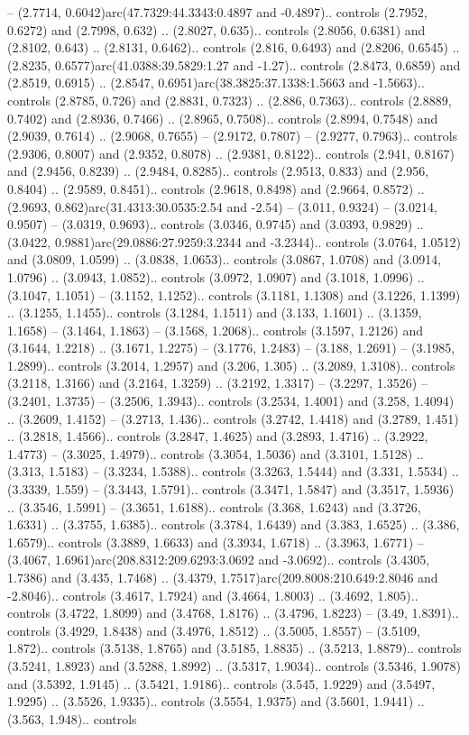-- (2.7714, 0.6042)arc(47.7329:44.3343:0.4897 and -0.4897).. controls (2.7952, 0.6272) and (2.7998, 0.632) .. (2.8027, 0.635).. controls (2.8056, 0.6381) and (2.8102, 0.643) .. (2.8131, 0.6462).. controls (2.816, 0.6493) and (2.8206, 0.6545) .. (2.8235, 0.6577)arc(41.0388:39.5829:1.27 and -1.27).. controls (2.8473, 0.6859) and (2.8519, 0.6915) .. (2.8547, 0.6951)arc(38.3825:37.1338:1.5663 and -1.5663).. controls (2.8785, 0.726) and (2.8831, 0.7323) .. (2.886, 0.7363).. controls (2.8889, 0.7402) and (2.8936, 0.7466) .. (2.8965, 0.7508).. controls (2.8994, 0.7548) and (2.9039, 0.7614) .. (2.9068, 0.7655) -- (2.9172, 0.7807) -- (2.9277, 0.7963).. controls (2.9306, 0.8007) and (2.9352, 0.8078) .. (2.9381, 0.8122).. controls (2.941, 0.8167) and (2.9456, 0.8239) .. (2.9484, 0.8285).. controls (2.9513, 0.833) and (2.956, 0.8404) .. (2.9589, 0.8451).. controls (2.9618, 0.8498) and (2.9664, 0.8572) .. (2.9693, 0.862)arc(31.4313:30.0535:2.54 and -2.54) -- (3.011, 0.9324) -- (3.0214, 0.9507) -- (3.0319, 0.9693).. controls (3.0346, 0.9745) and (3.0393, 0.9829) .. (3.0422, 0.9881)arc(29.0886:27.9259:3.2344 and -3.2344).. controls (3.0764, 1.0512) and (3.0809, 1.0599) .. (3.0838, 1.0653).. controls (3.0867, 1.0708) and (3.0914, 1.0796) .. (3.0943, 1.0852).. controls (3.0972, 1.0907) and (3.1018, 1.0996) .. (3.1047, 1.1051) -- (3.1152, 1.1252).. controls (3.1181, 1.1308) and (3.1226, 1.1399) .. (3.1255, 1.1455).. controls (3.1284, 1.1511) and (3.133, 1.1601) .. (3.1359, 1.1658) -- (3.1464, 1.1863) -- (3.1568, 1.2068).. controls (3.1597, 1.2126) and (3.1644, 1.2218) .. (3.1671, 1.2275) -- (3.1776, 1.2483) -- (3.188, 1.2691) -- (3.1985, 1.2899).. controls (3.2014, 1.2957) and (3.206, 1.305) .. (3.2089, 1.3108).. controls (3.2118, 1.3166) and (3.2164, 1.3259) .. (3.2192, 1.3317) -- (3.2297, 1.3526) -- (3.2401, 1.3735) -- (3.2506, 1.3943).. controls (3.2534, 1.4001) and (3.258, 1.4094) .. (3.2609, 1.4152) -- (3.2713, 1.436).. controls (3.2742, 1.4418) and (3.2789, 1.451) .. (3.2818, 1.4566).. controls (3.2847, 1.4625) and (3.2893, 1.4716) .. (3.2922, 1.4773) -- (3.3025, 1.4979).. controls (3.3054, 1.5036) and (3.3101, 1.5128) .. (3.313, 1.5183) -- (3.3234, 1.5388).. controls (3.3263, 1.5444) and (3.331, 1.5534) .. (3.3339, 1.559) -- (3.3443, 1.5791).. controls (3.3471, 1.5847) and (3.3517, 1.5936) .. (3.3546, 1.5991) -- (3.3651, 1.6188).. controls (3.368, 1.6243) and (3.3726, 1.6331) .. (3.3755, 1.6385).. controls (3.3784, 1.6439) and (3.383, 1.6525) .. (3.386, 1.6579).. controls (3.3889, 1.6633) and (3.3934, 1.6718) .. (3.3963, 1.6771) -- (3.4067, 1.6961)arc(208.8312:209.6293:3.0692 and -3.0692).. controls (3.4305, 1.7386) and (3.435, 1.7468) .. (3.4379, 1.7517)arc(209.8008:210.649:2.8046 and -2.8046).. controls (3.4617, 1.7924) and (3.4664, 1.8003) .. (3.4692, 1.805).. controls (3.4722, 1.8099) and (3.4768, 1.8176) .. (3.4796, 1.8223) -- (3.49, 1.8391).. controls (3.4929, 1.8438) and (3.4976, 1.8512) .. (3.5005, 1.8557) -- (3.5109, 1.872).. controls (3.5138, 1.8765) and (3.5185, 1.8835) .. (3.5213, 1.8879).. controls (3.5241, 1.8923) and (3.5288, 1.8992) .. (3.5317, 1.9034).. controls (3.5346, 1.9078) and (3.5392, 1.9145) .. (3.5421, 1.9186).. controls (3.545, 1.9229) and (3.5497, 1.9295) .. (3.5526, 1.9335).. controls (3.5554, 1.9375) and (3.5601, 1.9441) .. (3.563, 1.948).. controls 